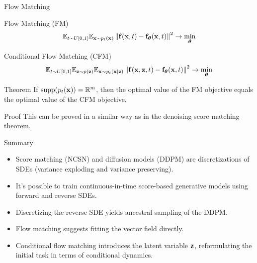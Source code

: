 \documentclass{beamer}
\renewcommand{\eqpause}{}
\begin{document}
\begin{frame}{Flow Matching}
	\begin{block}{Flow Matching (FM)}
		\vspace{-0.3cm}
		\[
			\mathbb{E}_{t \sim U[0, 1]} \mathbb{E}_{\mathbf{x} \sim p_t(\mathbf{x})}\left\| \mathbf{f}(\mathbf{x}, t) - \mathbf{f}_{\boldsymbol{\theta}}(\mathbf{x}, t) \right\|^2 \rightarrow \min_{\boldsymbol{\theta}}
		\]
		\vspace{-0.3cm}
	\end{block}
	\begin{block}{Conditional Flow Matching (CFM)}
		\vspace{-0.3cm}
		\[
			\mathbb{E}_{t \sim U[0, 1]} \mathbb{E}_{\mathbf{z} \sim p(\mathbf{z})} \mathbb{E}_{\mathbf{x} \sim p_t(\mathbf{x} | \mathbf{z})}\left\| \mathbf{f}(\mathbf{x}, \mathbf{z}, t) - \mathbf{f}_{\boldsymbol{\theta}}(\mathbf{x}, t) \right\|^2 \rightarrow \min_{\boldsymbol{\theta}}
		\]
		\vspace{-0.5cm}
	\end{block}
    \eqpause
	\begin{block}{Theorem}
		If $\text{supp}(p_t(\mathbf{x})) = \mathbb{R}^m$, then the optimal value of the FM objective equals the optimal value of the CFM objective.
	\end{block}
    \eqpause
	\begin{block}{Proof}
		This can be proved in a similar way as in the denoising score matching theorem.
	\end{block}
\end{frame}
\begin{frame}{Summary}
	\begin{itemize}
		\item Score matching (NCSN) and diffusion models (DDPM) are discretizations of SDEs (variance exploding and variance preserving).
		\vfill
		\item It's possible to train continuous-in-time score-based generative models using forward and reverse SDEs.
		\vfill
		\item Discretizing the reverse SDE yields ancestral sampling of the DDPM.
		\vfill
		\item Flow matching suggests fitting the vector field directly.
		\vfill 
		\item Conditional flow matching introduces the latent variable $\mathbf{z}$, reformulating the initial task in terms of conditional dynamics.
	\end{itemize}
\end{frame}
\end{document}
